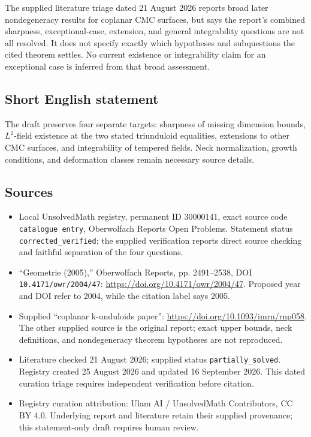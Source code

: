 \documentclass[11pt]{article}
\begin{document}
The supplied literature triage dated 21 August 2026 reports broad later nondegeneracy results for coplanar CMC surfaces, but says the report's combined sharpness, exceptional-case, extension, and general integrability questions are not all resolved. It does not specify exactly which hypotheses and subquestions the cited theorem settles. No current existence or integrability claim for an exceptional case is inferred from that broad assessment.
\subsection{Short English statement}
The draft preserves four separate targets: sharpness of missing dimension bounds, \(L^2\)-field existence at the two stated triunduloid equalities, extensions to other CMC surfaces, and integrability of tempered fields. Neck normalization, growth conditions, and deformation classes remain necessary source details.
\subsection{Sources}
\begin{itemize}
\item Local UnsolvedMath registry, permanent ID \(30000141\), exact source code \texttt{catalogue entry}, Oberwolfach Reports Open Problems. Statement status \texttt{corrected\_verified}; the supplied verification reports direct source checking and faithful separation of the four questions.
\item ``Geometrie (2005),'' Oberwolfach Reports, pp. 2491--2538, DOI \texttt{10.4171/owr/2004/47}: \url{https://doi.org/10.4171/owr/2004/47}. Proposed year and DOI refer to 2004, while the citation label says 2005.
\item Supplied ``coplanar k-unduloids paper'': \url{https://doi.org/10.1093/imrn/rnp058}. The other supplied source is the original report; exact upper bounds, neck definitions, and nondegeneracy theorem hypotheses are not reproduced.
\item Literature checked 21 August 2026; supplied status \texttt{partially\_solved}. Registry created 25 August 2026 and updated 16 September 2026. This dated curation triage requires independent verification before citation.
\item Registry curation attribution: Ulam AI / UnsolvedMath Contributors, CC BY 4.0. Underlying report and literature retain their supplied provenance; this statement-only draft requires human review.
\end{itemize}
\end{document}
